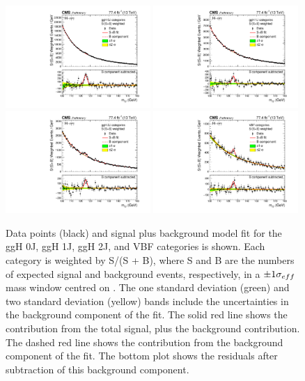 \begin{figure}[hptb]
\centering
\includegraphics[width=0.49\textwidth]{Figures/Results/MassPlot_0J.pdf}
\includegraphics[width=0.49\textwidth]{Figures/Results/MassPlot_1J.pdf} \\
\includegraphics[width=0.49\textwidth]{Figures/Results/MassPlot_2J.pdf}
\includegraphics[width=0.49\textwidth]{Figures/Results/MassPlot_VBF.pdf}
\caption{
  Data points (black) and signal plus background model fit 
  for the ggH 0J, ggH 1J, ggH 2J, and VBF categories is shown. 
  Each category is weighted by S/(S + B), 
  where S and B are the numbers of expected signal and background events, respectively, 
  in a $\pm 1 \sigma_{eff}$ mass window centred on \mH. 
  The one standard deviation (green) and two standard deviation (yellow) bands 
  include the uncertainties in the background component of the fit. 
  The solid red line shows the contribution from the total signal, plus the background contribution. 
  The dashed red line shows the contribution from the background component of the fit. 
  The bottom plot shows the residuals after subtraction of this background component.
}
\label{fig:results_MassPlots}
\end{figure}

